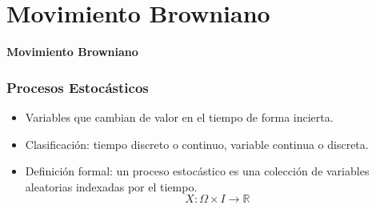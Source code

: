 \section{Movimiento Browniano}


\begin{frame}
    \begin{center}
        \textbf{\huge Movimiento Browniano}
    \end{center}
\end{frame}


\begin{frame}
    \frametitle{Procesos Estocásticos}
    \begin{itemize}
        \item Variables que cambian de valor en el tiempo de forma incierta.
        \item Clasificación: tiempo discreto o continuo, variable continua o discreta.
        \item Definición formal: un proceso estocástico es una colección de variables aleatorias indexadas por el tiempo.
        \[X: \Omega \times I \rightarrow \mathbb{R}\]
    \end{itemize}
\end{frame}


